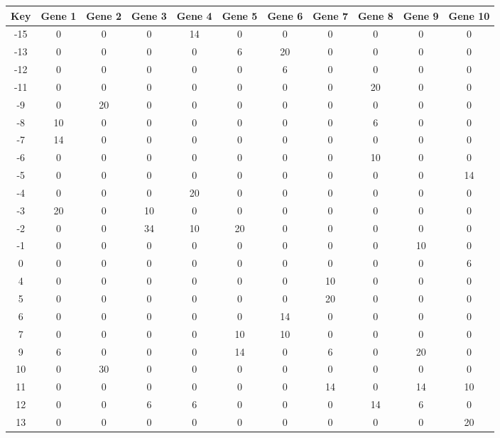 \begin{tabular}{|c|c|c|c|c|c|c|c|c|c|c|}
\hline
Key & Gene 1 & Gene 2 & Gene 3 & Gene 4 & Gene 5 & Gene 6 & Gene 7 & Gene 8 & Gene 9 & Gene 10 \\
\hline
-15 & 0 & 0 & 0 & 14 & 0 & 0 & 0 & 0 & 0 & 0 \\
-13 & 0 & 0 & 0 & 0 & 6 & 20 & 0 & 0 & 0 & 0 \\
-12 & 0 & 0 & 0 & 0 & 0 & 6 & 0 & 0 & 0 & 0 \\
-11 & 0 & 0 & 0 & 0 & 0 & 0 & 0 & 20 & 0 & 0 \\
-9 & 0 & 20 & 0 & 0 & 0 & 0 & 0 & 0 & 0 & 0 \\
-8 & 10 & 0 & 0 & 0 & 0 & 0 & 0 & 6 & 0 & 0 \\
-7 & 14 & 0 & 0 & 0 & 0 & 0 & 0 & 0 & 0 & 0 \\
-6 & 0 & 0 & 0 & 0 & 0 & 0 & 0 & 10 & 0 & 0 \\
-5 & 0 & 0 & 0 & 0 & 0 & 0 & 0 & 0 & 0 & 14 \\
-4 & 0 & 0 & 0 & 20 & 0 & 0 & 0 & 0 & 0 & 0 \\
-3 & 20 & 0 & 10 & 0 & 0 & 0 & 0 & 0 & 0 & 0 \\
-2 & 0 & 0 & 34 & 10 & 20 & 0 & 0 & 0 & 0 & 0 \\
-1 & 0 & 0 & 0 & 0 & 0 & 0 & 0 & 0 & 10 & 0 \\
0 & 0 & 0 & 0 & 0 & 0 & 0 & 0 & 0 & 0 & 6 \\
4 & 0 & 0 & 0 & 0 & 0 & 0 & 10 & 0 & 0 & 0 \\
5 & 0 & 0 & 0 & 0 & 0 & 0 & 20 & 0 & 0 & 0 \\
6 & 0 & 0 & 0 & 0 & 0 & 14 & 0 & 0 & 0 & 0 \\
7 & 0 & 0 & 0 & 0 & 10 & 10 & 0 & 0 & 0 & 0 \\
9 & 6 & 0 & 0 & 0 & 14 & 0 & 6 & 0 & 20 & 0 \\
10 & 0 & 30 & 0 & 0 & 0 & 0 & 0 & 0 & 0 & 0 \\
11 & 0 & 0 & 0 & 0 & 0 & 0 & 14 & 0 & 14 & 10 \\
12 & 0 & 0 & 6 & 6 & 0 & 0 & 0 & 14 & 6 & 0 \\
13 & 0 & 0 & 0 & 0 & 0 & 0 & 0 & 0 & 0 & 20 \\
\hline
\end{tabular}
